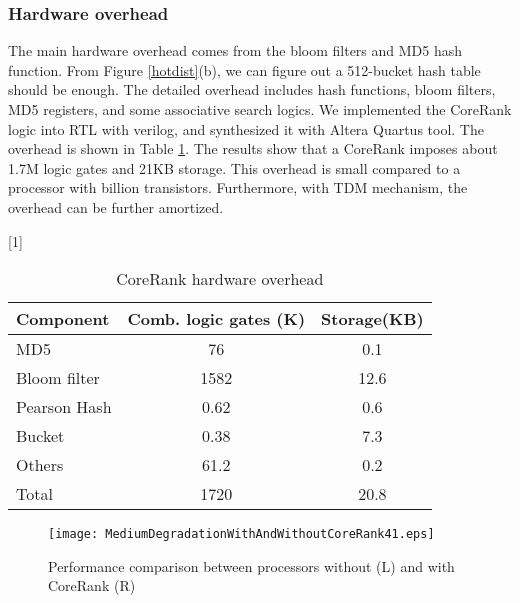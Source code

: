 \subsubsection{Hardware overhead}
The main hardware overhead comes from the bloom filters and MD5 hash function. From Figure \ref{hotdist}(b), we can figure out a 512-bucket hash table should be enough. The detailed overhead includes hash functions, bloom filters, MD5 registers, and some associative search logics. We implemented the CoreRank logic into RTL with verilog, and synthesized it with Altera Quartus tool. The overhead is shown in Table \ref{overhead}. The results show that a CoreRank imposes about 1.7M logic gates and 21KB storage. This overhead is small compared to a processor with  billion transistors.   Furthermore, with TDM mechanism, the overhead can be further amortized.

\begin{table}[t!]
\caption{CoreRank hardware overhead}\label{overhead}
\begin{center}\small
\vspace{0.2cm}
\scalebox{1}[1]{
\begin{tabular}{|l|c|c|}
\hline
 \textbf{Component}   &   \textbf{Comb. logic gates (K)} &\textbf{Storage(KB)}\\
\hline
\hline
MD5                     &76      &       0.1       \\
\hline
 Bloom filter    &  1582   &   12.6       \\
\hline
Pearson Hash  & 0.62 & 0.6  \\
\hline
Bucket                &   0.38 & 7.3    \\
\hline
Others                 &   61.2   & 0.2 \\
\hline
Total                   &1720  &   20.8   \\

\hline
\end{tabular}}

\end{center}
\end{table}

\begin{figure*}[t]

 \centering
  \texttt{[image: MediumDegradationWithAndWithoutCoreRank41.eps]}\\
\caption{Performance comparison between processors without (L) and with CoreRank (R)}
\label{comp1}
\end{figure*}

